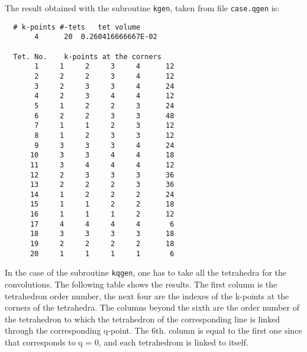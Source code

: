 The result obtained with the subroutine \verb"kgen", taken from file
\verb"case.qgen" is:

\begin{verbatim} 
  # k-points #-tets   tet volume 
       4      20  0.260416666667E-02
 
  Tet. No.    k-points at the corners
       1     1     2     3     4      12
       2     2     2     3     4      12
       3     2     3     3     4      24
       4     2     3     4     4      12
       5     1     2     2     3      24
       6     2     2     3     3      48
       7     1     1     2     3      12
       8     1     2     3     3      12
       9     3     3     3     4      24
      10     3     3     4     4      18
      11     3     4     4     4      12
      12     2     3     3     3      36
      13     2     2     2     3      36
      14     1     2     2     2      24
      15     1     1     2     2      18
      16     1     1     1     2      12
      17     4     4     4     4       6
      18     3     3     3     3      18
      19     2     2     2     2      18
      20     1     1     1     1       6
\end{verbatim}

In the case of the subroutine \verb"kqgen", one has to take all the
tetrahedra for the convolutions. The following table shows the results.
The first column is the tetrahedron order number, the next four are the
indexes of the k-points at the corners of the tetrahedra. The columns
beyond the sixth are the order number of the tetrahedron to which the
tetrahedron of the corresponding line is linked through the corresponding
q-point. The 6th. column is equal to the first one since that corresponds
to q = 0, and each tetrahedrom is linked to itself.

